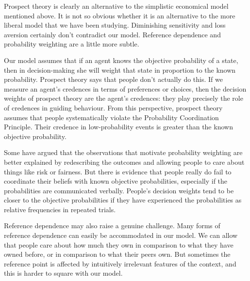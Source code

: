 Prospect theory is clearly an alternative to the simplistic economical model
mentioned above. It is not so obvious whether it is an alternative to the more
liberal model that we have been studying. Diminishing sensitivity and loss
aversion certainly don't contradict our model. Reference dependence and
probability weighting are a little more subtle.

Our model assumes that if an agent knows the objective probability of a state,
then in decision-making she will weight that state in proportion to the known
probability. Prospect theory says that people don't actually do this. If we
measure an agent's credences in terms of preferences or choices, then the
decision weights of prospect theory are the agent's credences: they play
precisely the role of credences in guiding behaviour. From this perspective,
prospect theory assumes that people systematically violate the Probability
Coordination Principle. Their credence in low-probability events is greater than
the known objective probability.

Some have argued that the observations that motivate probability weighting are
better explained by redescribing the outcomes and allowing people to care about
things like risk or fairness. But there is evidence that people really do fail
to coordinate their beliefs with known objective probabilities, especially if
the probabilities are communicated verbally. People's decision weights tend
to be closer to the objective probabilities if they have experienced the
probabilities as relative frequencies in repeated trials.%



Reference dependence may also raise a genuine challenge. Many forms of reference
dependence can easily be accommodated in our model. We can allow that people
care about how much they own in comparison to what they have owned before, or in
comparison to what their peers own. But sometimes the reference point is
affected by intuitively irrelevant features of the context, and this is harder
to square with our model.

